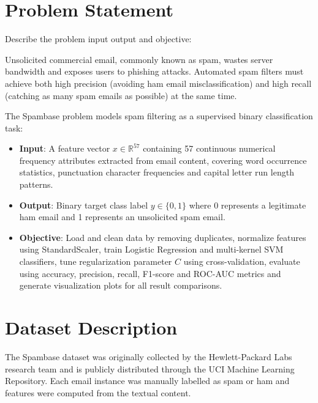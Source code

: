 \documentclass[12pt,a4paper]{article}
\begin{document}
\section{Problem Statement}
Describe the problem input output and objective:

Unsolicited commercial email, commonly known as spam, wastes server bandwidth and exposes users to phishing attacks. Automated spam filters must achieve both high precision (avoiding ham email misclassification) and high recall (catching as many spam emails as possible) at the same time.

The Spambase problem models spam filtering as a supervised binary classification task:
\begin{itemize}
\item \textbf{Input}: A feature vector $x \in \mathbb{R}^{57}$ containing 57 continuous numerical frequency attributes extracted from email content, covering word occurrence statistics, punctuation character frequencies and capital letter run length patterns.
\item \textbf{Output}: Binary target class label $y \in \{0, 1\}$ where 0 represents a legitimate ham email and 1 represents an unsolicited spam email.
\item \textbf{Objective}: Load and clean data by removing duplicates, normalize features using StandardScaler, train Logistic Regression and multi-kernel SVM classifiers, tune regularization parameter $C$ using cross-validation, evaluate using accuracy, precision, recall, F1-score and ROC-AUC metrics and generate visualization plots for all result comparisons.
\end{itemize}

\section{Dataset Description}

The Spambase dataset was originally collected by the Hewlett-Packard Labs research team and is publicly distributed through the UCI Machine Learning Repository. Each email instance was manually labelled as spam or ham and features were computed from the textual content.
\end{document}
